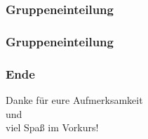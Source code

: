 \documentclass{beamer}
\begin{document}
\begin{frame}
\frametitle{Gruppeneinteilung}
\end{frame}

{
	
	
	
	
	
}

\begin{frame}
\frametitle{Gruppeneinteilung}
\end{frame}

\begin{frame}
\frametitle{Ende}
\begin{center}
Danke für eure Aufmerksamkeit\\
und\\
viel Spaß im Vorkurs!
\end{center}
\end{frame}
\end{document}
